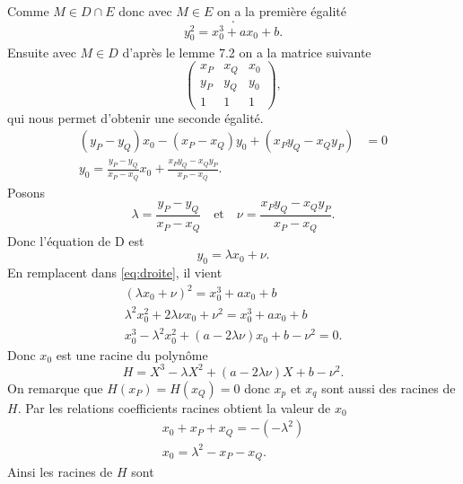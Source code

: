 \begin{demonstration}
\begin{description}
\begin{description}
            Comme $M \in D \cap E$ donc avec $M \in E$ on a la première égalité
            \[
            .\] 
            \begin{align}
                \label{eq:droite} 
             y_0^2 = x_0^3 + ax_0 + b 
            .\end{align}
            Ensuite avec $M \in D$ d'après le lemme 7.2 on a la matrice suivante
            \[
                \begin{pmatrix}
                    x_P & x_Q & x_0 \\
                    y_P & y_Q & y_0  \\
                    1   & 1   & 1
                \end{pmatrix}
            ,\] 
           qui nous permet d'obtenir une seconde égalité.
           \begin{align*}
               \left( y_P - y_Q \right)x_0 - \left( x_P - x_Q \right)y_0 + \left( x_P y_Q - x_Q y_P \right) &= 0 \\
               y_0 = \frac{y_P - y_Q}{x_P - x_Q}x_0 + \frac{x_P y_Q - x_Q y_P}{x_P - x_Q}
           .\end{align*}
           Posons 
           \[
           \lambda = \frac{y_P - y_Q}{x_P - x_Q} \quad \text{et} \quad \nu = \frac{x_P y_Q - x_Q y_P}{x_P - x_Q}
           .\] 
           Donc l'équation de D est
           \[
           y_0 = \lambda x_0 + \nu
           .\] 
           En remplacent dans \eqref{eq:droite}, il vient
           \begin{align*}
               \left( \lambda x_0 + \nu  \right)^2 = x_0^3 + ax_0 + b \\
               \lambda^2 x_0^2 + 2\lambda \nu x_0 + \nu^2 = x_0^3 + ax_0 + b \\
               x_0^3 - \lambda^2 x_0^2 + \left( a - 2\lambda \nu  \right)x_0 + b - \nu^2 = 0
           .\end{align*}
           Donc $x_0$ est une racine du polynôme
            \[
           H = X^3 - \lambda X^2 + \left( a - 2\lambda\nu \right)X + b - \nu^2
           .\] 
           On remarque que $H(x_P) = H(x_Q) = 0$ donc $x_p$ et $x_q$ sont aussi des racines de $H$.
           Par les relations coefficients racines obtient la valeur de $x_0$
           \begin{align*}
               x_0 + x_P + x_Q = - \left( - \lambda^2 \right) \\
               x_0 = \lambda^2 - x_P - x_Q
           .\end{align*} 
           Ainsi les racines de $H$ sont

\end{description}
\end{description}
\end{demonstration}
